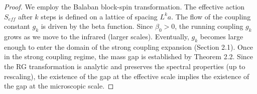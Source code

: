 \begin{proof}
We employ the Balaban block-spin transformation. The effective action $S_{eff}$ after $k$ steps is defined on a lattice of spacing $L^k a$.
The flow of the coupling constant $g_k$ is driven by the beta function.
Since $\beta_0 > 0$, the running coupling $g_k$ grows as we move to the infrared (larger scales).
Eventually, $g_k$ becomes large enough to enter the domain of the strong coupling expansion (Section 2.1).
Once in the strong coupling regime, the mass gap is established by Theorem 2.2.
Since the RG transformation is analytic and preserves the spectral properties (up to rescaling), the existence of the gap at the effective scale implies the existence of the gap at the microscopic scale.
\end{proof}



